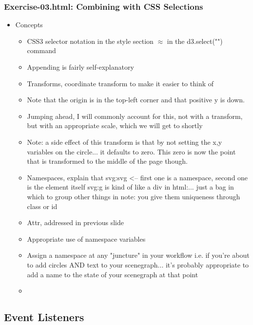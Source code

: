 \documentclass{beamer}
\begin{document}
\begin{frame}
\begin{frame}
    \frametitle{Exercise-03.html: Combining with CSS Selections}
        \begin{itemize}
            \item Concepts
            \begin{itemize}
                \item CSS3 selector notation in the style section $\approx$ in the d3.select("") command
                \item Appending is fairly self-explanatory
                \item Transforms, coordinate transform to make it easier to think of
                \item Note that the origin is in the top-left corner and that positive y is down.
                \item Jumping ahead, I will commonly account for this, not with a transform, but with an appropriate scale, which we will get to shortly
                \item Note: a side effect of this transform is that by not setting the x,y variables on the circle... it defaults to zero.  This zero is now the point that is transformed to the middle of the page though.
                \item Namespaces, explain that svg:svg <-- first one is a namespace, second one is the element itself svg:g is kind of like a div in html:... just a bag in which to group other things in note: you give them uniqueness through class or id
                \item Attr, addressed in previous slide
                \item Appropriate use of namespace variables
                \item Assign a namespace at any "juncture" in your workflow i.e. if you're about to add circles AND text to your scenegraph... it's probably appropriate to add a name to the state of your scenegraph at that point
                \item 
            \end{itemize}
        \end{itemize}
\end{frame}



\subsection{Event Listeners}


\end{frame}
\end{document}
